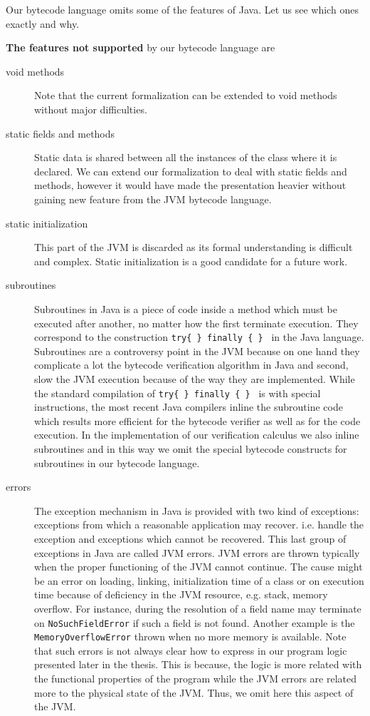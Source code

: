 Our bytecode language omits some of the features of Java. Let us see which ones exactly and why.

\textbf{The features not supported} by our bytecode language are 
\begin{description} 
   \item[void methods]  Note that the current formalization can be extended to void methods without major difficulties.

   \item [static fields and methods] Static data is shared between all the instances of the class
         where it is declared.  We can extend our formalization to deal with static fields and methods,
	 however it would have made the presentation heavier without gaining new feature from the JVM bytecode language. 

   \item [static initialization] This part of the JVM is discarded as its formal understanding is difficult and complex.
         Static initialization is a good candidate for a future work. 

   \item [subroutines] Subroutines in Java is a piece of code inside a method which must be executed 
         after another, no matter how the first terminate execution. 
	 They correspond to the construction \texttt{try\{ \} finally \{ \} } in the Java language.
	 Subroutines are a controversy point 
	 in the JVM because on one hand they complicate a lot the bytecode verification algorithm in Java and second,
	 slow the JVM execution because of the way they are implemented. While the standard compilation of  \texttt{try\{ \} finally \{ \} }
	 is with special instructions, the most recent Java compilers inline the subroutine 
	 code which results more efficient for the bytecode verifier as well as for the code execution. 
	 In the implementation of our verification calculus we also inline subroutines and in this way we omit the special bytecode constructs
	 for subroutines in our bytecode language. 
	
  
  \item [errors] The exception mechanism in Java is provided with two kind of exceptions: exceptions from which 
        a reasonable application may recover. i.e. handle the exception and exceptions which cannot be recovered. This last group
	of exceptions in Java are called JVM errors. JVM errors are  thrown typically when the proper functioning of the JVM cannot 
	continue. 
	The cause might be an error  on loading, linking, initialization time of a class or on execution time because of deficiency in the JVM resource, e.g.
	stack, memory overflow.
	For instance, during the resolution of a field name may terminate on \texttt{NoSuchFieldError} if 
	such a field is not found. Another example is the \texttt{MemoryOverflowError} thrown when no more memory is available.
	Note that such errors is not always clear how to express in our program logic presented later in the thesis. This is because, 
	the logic is more related with the functional properties of the program while the JVM errors are related more to the physical
	state of the JVM. Thus, we omit here this aspect of the JVM.
	 


\end{description}
